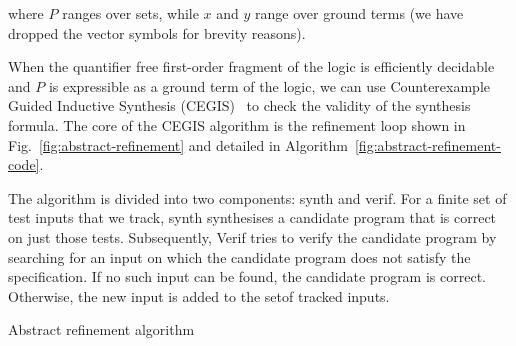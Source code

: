 where $P$ ranges over sets, while $x$ and $y$ range over ground terms (we have dropped
 the vector symbols for brevity reasons).

When the quantifier free first-order fragment of the logic is efficiently decidable and
$P$ is expressible as a ground term of the logic, we can use
Counterexample Guided Inductive Synthesis (CEGIS)~\cite{lezama-thesis,sketch} to
check the validity of the synthesis formula. The core of the CEGIS algorithm is
the refinement loop shown in Fig.~\ref{fig:abstract-refinement} and
detailed in Algorithm~\ref{fig:abstract-refinement-code}.  

The algorithm is divided into two
components: {\sc synth} and {\sc verif}. For a finite set of test
inputs that we track, {\sc synth} synthesises a candidate program that is correct on just those tests.
Subsequently, {\sc Verif} tries to verify the candidate program by searching for an input on
which the candidate program does not satisfy the specification.  If no such input
can be found, the candidate program is correct.  Otherwise, the new input is added
to the setof tracked inputs.  

\begin{algorithm*}
 \caption{Abstract refinement algorithm
 \label{fig:abstract-refinement-code}}

 \begin{multicols}{2}
 \begin{algorithmic}[1]
\Statex
{}
    \State {}
  \Else
    \State {}
  \EndIf
\EndFunction
\Statex
{}
    \State {}
  \Else
    \State {}
  \EndIf
\EndFunction
\columnbreak
\Statex
{}
  \Loop
      \State {}
    \EndIf
      \State {}
    \Else
    \EndIf
  \EndLoop
\EndFunction
 \end{algorithmic}
 \end{multicols}
\end{algorithm*}


